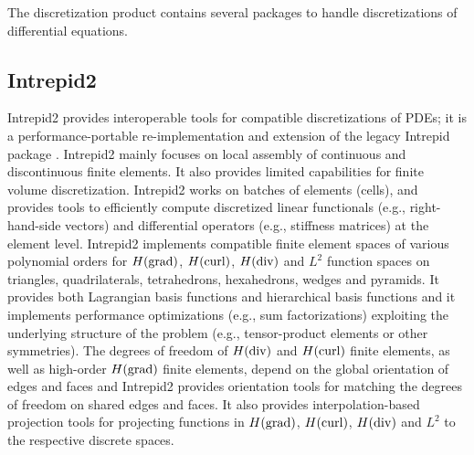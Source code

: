 The discretization product contains several packages to handle discretizations of differential equations.

\subsection{Intrepid2}
Intrepid2 provides interoperable tools for compatible discretizations of PDEs; it is a performance-portable re-implementation and extension of the legacy Intrepid package \cite{bochev2012}. Intrepid2 mainly focuses on local assembly of continuous and discontinuous finite elements. It also provides limited capabilities for finite volume discretization.  Intrepid2 works on batches of elements (cells), and provides tools to efficiently compute discretized linear functionals (e.g., right-hand-side vectors) and differential operators (e.g., stiffness matrices) at the element level. Intrepid2 implements compatible finite element spaces of various polynomial orders for $H({\rm grad})$, $H({\rm curl})$, $H({\rm div})$ and $L^2$ function spaces on triangles, quadrilaterals, tetrahedrons, hexahedrons, wedges and pyramids. It provides both Lagrangian basis functions and hierarchical basis functions \cite{fuentes2015} and it implements performance optimizations (e.g., sum factorizations) exploiting the underlying structure of the problem (e.g., tensor-product elements or other symmetries).  The degrees of freedom of $H({\rm div})$ and $H({\rm curl})$ finite elements, as well as high-order $H({\rm grad})$ finite elements, depend on the global orientation of edges and faces and Intrepid2 provides orientation tools for matching the degrees of freedom on shared edges and faces. It also provides interpolation-based projection tools for projecting functions in $H({\rm grad})$, $H({\rm curl})$, $H({\rm div})$ and $L^2$ to the respective discrete spaces.  
